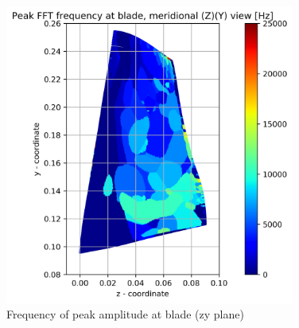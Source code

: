 \begin{figure}[ht]
	\centering
	\includegraphics[width=0.85\textwidth]{Figures/blade-zy-peak-freq.png}
	\caption{Frequency of peak amplitude at blade (zy plane)} \label{blade-zy-peak-freq}
\end{figure}

